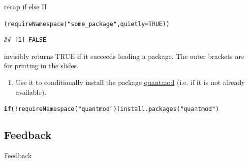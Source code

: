 \documentclass[xcolor=table,           xcolor=dvipsnames]{beamer}\usepackage[]{graphicx}\usepackage[]{color}
\makeatletter
\newcommand{\hlnum}[1]{\textcolor[rgb]{0,0,0}{#1}}
\newcommand{\hlstr}[1]{\textcolor[rgb]{0.545,0.137,0.137}{#1}}
\newcommand{\hlopt}[1]{\textcolor[rgb]{0,0,0}{#1}}
\newcommand{\hlstd}[1]{\textcolor[rgb]{0,0,0}{#1}}
\newcommand{\hlkwa}[1]{\textcolor[rgb]{1,0,0}{\textbf{#1}}}
\newcommand{\hlkwc}[1]{\textcolor[rgb]{1,0,1}{#1}}
\newcommand{\hlkwd}[1]{\textcolor[rgb]{0,0,1}{#1}}
\newenvironment{kframe}{%
 \def\at@end@of@kframe{}%
 \ifinner\ifhmode%
  \def\at@end@of@kframe{\end{minipage}}%
  \begin{minipage}{\columnwidth}%
 \fi\fi%
 \def\FrameCommand##1{\hskip\@totalleftmargin \hskip-\fboxsep
 \colorbox{shadecolor}{##1}\hskip-\fboxsep
     \hskip-\linewidth \hskip-\@totalleftmargin \hskip\columnwidth}%
 \MakeFramed {\advance\hsize-\width
   \@totalleftmargin\z@ \linewidth\hsize
   \@setminipage}}%
 {\par\unskip\endMakeFramed%
 \at@end@of@kframe}
\newenvironment{knitrout}{}{} %
\makeatother
\begin{document}
\begin{frame}[fragile]{recap \alert{if else} II}
\begin{knitrout}
\color{fgcolor}\begin{kframe}
\begin{alltt}
\hlstd{(}  \hlkwd{requireNamespace}\hlstd{(}\hlstr{"some_package"}\hlstd{,} \hlkwc{quietly}\hlstd{=}\hlnum{TRUE}\hlstd{)  )}
\end{alltt}
\begin{verbatim}
## [1] FALSE
\end{verbatim}
\end{kframe}
\end{knitrout}
invisibly returns TRUE if it succeeds loading a package. The outer brackets are for printing in the slides.
\begin{enumerate}
\item Use it to conditionally install the package \href{https://cran.r-project.org/package=quantmod}{quantmod} (i.e. if it is not already available).
\end{enumerate}
\pause
\begin{knitrout}\small
{}\color{fgcolor}\begin{kframe}
\begin{alltt}
\hlkwa{if}\hlstd{(}\hlopt{!}\hlkwd{requireNamespace}\hlstd{(}\hlstr{"quantmod"}\hlstd{))} \hlkwd{install.packages}\hlstd{(}\hlstr{"quantmod"}\hlstd{)}
\end{alltt}


{\ttfamily\noindent\itshape\color{messagecolor}{\#\# Loading required namespace: quantmod}}\end{kframe}
\end{knitrout}
\end{frame}

\subsection{Feedback}

\begin{frame}{Feedback}
\end{frame}
\end{document}
